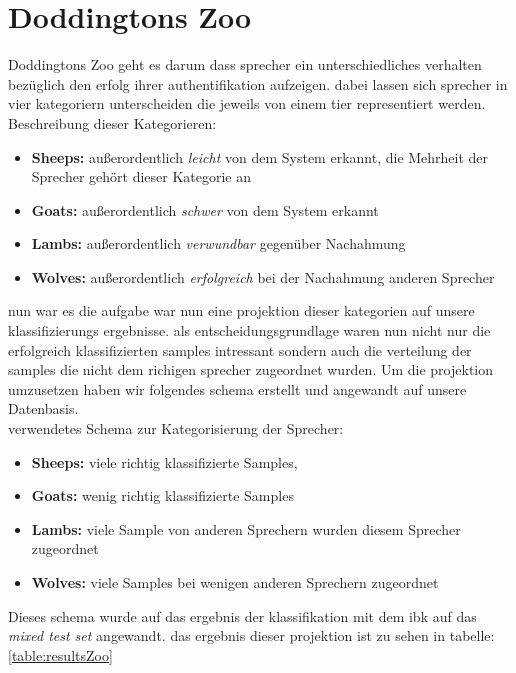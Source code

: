 \section{Doddingtons Zoo}


Doddingtons Zoo
geht es darum dass sprecher ein unterschiedliches verhalten bezüglich den erfolg ihrer authentifikation aufzeigen. \cite{zoo}
dabei lassen sich sprecher in vier kategoriern unterscheiden die jeweils von einem tier representiert werden. \\

Beschreibung dieser Kategorieren:
\begin{itemize}
	\item \textbf{Sheeps:} außerordentlich \textit{leicht} von dem System erkannt, die Mehrheit der Sprecher gehört dieser Kategorie an
	\item \textbf{Goats:} außerordentlich \textit{schwer} von dem System erkannt
	\item \textbf{Lambs:} außerordentlich \textit{verwundbar} gegenüber Nachahmung
	\item \textbf{Wolves:} außerordentlich \textit{erfolgreich} bei der Nachahmung anderen Sprecher
\end{itemize}
\cite{dittmann}


nun war es die aufgabe war nun eine projektion dieser kategorien auf unsere klassifizierungs ergebnisse. als entscheidungsgrundlage waren nun nicht nur  die erfolgreich klassifizierten samples intressant sondern auch die verteilung der samples die nicht dem richigen sprecher zugeordnet wurden. Um die projektion umzusetzen haben wir folgendes schema erstellt und angewandt auf unsere Datenbasis.\\

verwendetes Schema zur Kategorisierung der Sprecher:
\begin{itemize}
	\item \textbf{Sheeps:} viele richtig klassifizierte Samples,
	\item \textbf{Goats:} wenig richtig klassifizierte Samples
	\item \textbf{Lambs:} viele Sample von anderen Sprechern wurden diesem Sprecher zugeordnet
	\item \textbf{Wolves:} viele Samples bei wenigen anderen Sprechern zugeordnet
\end{itemize}

Dieses schema wurde auf das ergebnis der klassifikation mit dem ibk auf das \textit{mixed test set} angewandt. das ergebnis dieser projektion ist zu sehen in tabelle:\ref{table:resultsZoo}


